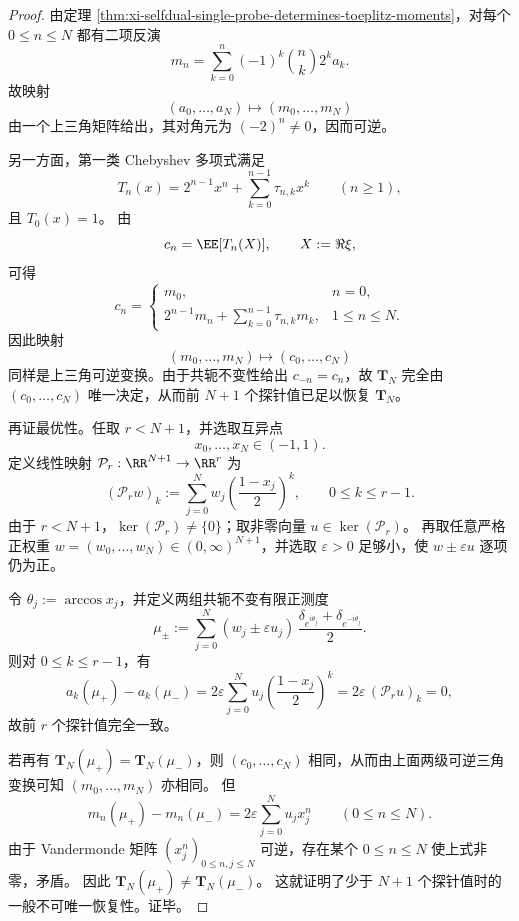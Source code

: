 \begin{proof}
由定理 \ref{thm:xi-selfdual-single-probe-determines-toeplitz-moments}，对每个 \(0\le n\le N\) 都有二项反演
\[
m_n=\sum_{k=0}^{n}(-1)^k\binom{n}{k}2^k a_k.
\]
故映射
\[
(a_0,\dots,a_N)\longmapsto (m_0,\dots,m_N)
\]
由一个上三角矩阵给出，其对角元为
\(
(-2)^n\neq 0
\)，因而可逆。

另一方面，第一类 Chebyshev 多项式满足
\[
T_n(x)=2^{n-1}x^n+\sum_{k=0}^{n-1}\tau_{n,k}x^k
\qquad(n\ge 1),
\]
且 \(T_0(x)=1\)。
由
\[
c_n=\EE[T_n(X)],
\qquad X:=\Re\xi,
\]
可得
\[
c_n=
\begin{cases}
m_0, & n=0,\\[4pt]
2^{n-1}m_n+\sum_{k=0}^{n-1}\tau_{n,k}m_k, & 1\le n\le N.
\end{cases}
\]
因此映射
\[
(m_0,\dots,m_N)\longmapsto (c_0,\dots,c_N)
\]
同样是上三角可逆变换。由于共轭不变性给出 \(c_{-n}=c_n\)，故 \(\mathbf{T}_N\) 完全由 \((c_0,\dots,c_N)\) 唯一决定，从而前 \(N+1\) 个探针值已足以恢复 \(\mathbf{T}_N\)。

再证最优性。任取 \(r<N+1\)，并选取互异点
\[
x_0,\dots,x_N\in(-1,1).
\]
定义线性映射 \(\mathcal P_r:\RR^{N+1}\to\RR^{r}\) 为
\[
(\mathcal P_r w)_k:=\sum_{j=0}^{N}w_j\left(\frac{1-x_j}{2}\right)^k,
\qquad 0\le k\le r-1.
\]
由于 \(r<N+1\)，\(\ker(\mathcal P_r)\neq\{0\}\)；取非零向量 \(u\in\ker(\mathcal P_r)\)。
再取任意严格正权重 \(w=(w_0,\dots,w_N)\in(0,\infty)^{N+1}\)，并选取 \(\varepsilon>0\) 足够小，使 \(w\pm\varepsilon u\) 逐项仍为正。

令 \(\theta_j:=\arccos x_j\)，并定义两组共轭不变有限正测度
\[
\mu_\pm:=
\sum_{j=0}^{N}(w_j\pm\varepsilon u_j)\,
\frac{\delta_{e^{i\theta_j}}+\delta_{e^{-i\theta_j}}}{2}.
\]
则对 \(0\le k\le r-1\)，有
\[
a_k(\mu_+)-a_k(\mu_-)
=
2\varepsilon\sum_{j=0}^{N}u_j\left(\frac{1-x_j}{2}\right)^k
=
2\varepsilon\,(\mathcal P_r u)_k
=
0,
\]
故前 \(r\) 个探针值完全一致。

若再有 \(\mathbf T_N(\mu_+)=\mathbf T_N(\mu_-)\)，则 \((c_0,\dots,c_N)\) 相同，从而由上面两级可逆三角变换可知 \((m_0,\dots,m_N)\) 亦相同。
但
\[
m_n(\mu_+)-m_n(\mu_-)=2\varepsilon\sum_{j=0}^{N}u_jx_j^n
\qquad(0\le n\le N).
\]
由于 Vandermonde 矩阵 \((x_j^n)_{0\le n,j\le N}\) 可逆，存在某个 \(0\le n\le N\) 使上式非零，矛盾。
因此 \(\mathbf T_N(\mu_+)\neq \mathbf T_N(\mu_-)\)。
这就证明了少于 \(N+1\) 个探针值时的一般不可唯一恢复性。证毕。
\end{proof}

